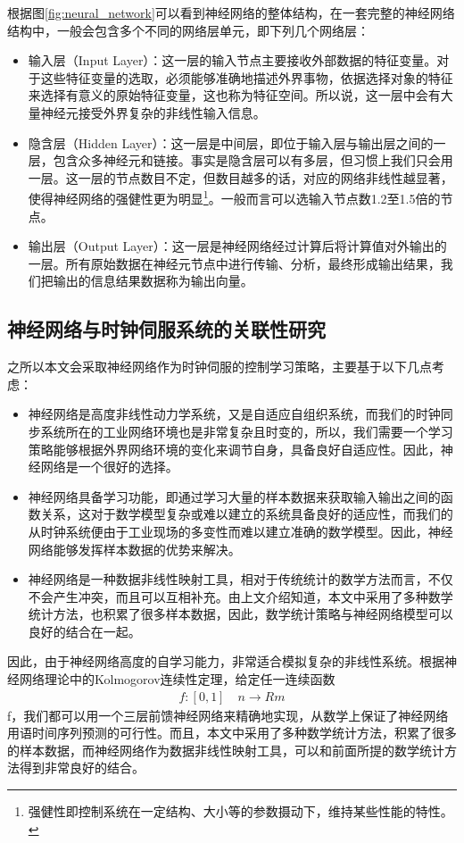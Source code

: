根据图\ref{fig:neural_network}可以看到神经网络的整体结构，在一套完整的神经网络结构中，一般会包含多个不同的网络层单元，即下列几个网络层：
\begin{itemize}[noitemsep,topsep=0pt,parsep=0pt,partopsep=0pt]
	\item 输入层（Input Layer）：这一层的输入节点主要接收外部数据的特征变量。对于这些特征变量的选取，必须能够准确地描述外界事物，依据选择对象的特征来选择有意义的原始特征变量，这也称为特征空间。所以说，这一层中会有大量神经元接受外界复杂的非线性输入信息。
	\item 隐含层（Hidden Layer）：这一层是中间层，即位于输入层与输出层之间的一层，包含众多神经元和链接。事实是隐含层可以有多层，但习惯上我们只会用一层。这一层的节点数目不定，但数目越多的话，对应的网络非线性越显著，使得神经网络的强健性更为明显\footnote{强健性即控制系统在一定结构、大小等的参数摄动下，维持某些性能的特性。}。一般而言可以选输入节点数1.2至1.5倍的节点。
	\item 输出层（Output Layer）：这一层是神经网络经过计算后将计算值对外输出的一层。所有原始数据在神经元节点中进行传输、分析，最终形成输出结果，我们把输出的信息结果数据称为输出向量。
\end{itemize}

\subsection{神经网络与时钟伺服系统的关联性研究}
之所以本文会采取神经网络作为时钟伺服的控制学习策略，主要基于以下几点考虑：
\begin{itemize}[noitemsep,topsep=0pt,parsep=0pt,partopsep=0pt]
	\item 神经网络是高度非线性动力学系统，又是自适应自组织系统，而我们的时钟同步系统所在的工业网络环境也是非常复杂且时变的，所以，我们需要一个学习策略能够根据外界网络环境的变化来调节自身，具备良好自适应性\supercite{64}。因此，神经网络是一个很好的选择。
	\item 神经网络具备学习功能，即通过学习大量的样本数据来获取输入输出之间的函数关系，这对于数学模型复杂或难以建立的系统具备良好的适应性，而我们的从时钟系统便由于工业现场的多变性而难以建立准确的数学模型。因此，神经网络能够发挥样本数据的优势来解决。
	\item 神经网络是一种数据非线性映射工具，相对于传统统计的数学方法而言，不仅不会产生冲突，而且可以互相补充\supercite{68}。由上文介绍知道，本文中采用了多种数学统计方法，也积累了很多样本数据，因此，数学统计策略与神经网络模型可以良好的结合在一起。
\end{itemize}

因此，由于神经网络高度的自学习能力，非常适合模拟复杂的非线性系统。根据神经网络理论中的Kolmogorov连续性定理，给定任一连续函数
\begin{align}
f:[0,1] \quad n \rightarrow Rm
\end{align}
f，我们都可以用一个三层前馈神经网络来精确地实现，从数学上保证了神经网络用语时间序列预测的可行性。而且，本文中采用了多种数学统计方法，积累了很多的样本数据，而神经网络作为数据非线性映射工具，可以和前面所提的数学统计方法得到非常良好的结合。

